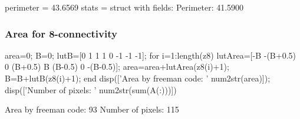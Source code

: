 \begin{mwindow}
perimeter =
   43.6569
stats = 
  struct with fields:
    Perimeter: 41.5900
\end{mwindow}


\subsubsection{Area for 8-connectivity}
\begin{matlab}
area=0;
B=0;   
lutB=[0 1 1 1 0 -1 -1 -1];
for i=1:length(z8)
   lutArea=[-B -(B+0.5) 0 (B+0.5) B (B-0.5) 0 -(B-0.5)];
   area=area+lutArea(z8(i)+1);
   B=B+lutB(z8(i)+1);
end
disp(['Area by freeman code: ' num2str(area)]);
disp(['Number of pixels: ' num2str(sum(A(:)))])
\end{matlab}

\begin{mwindow}
Area by freeman code: 93
Number of pixels: 115
\end{mwindow}

